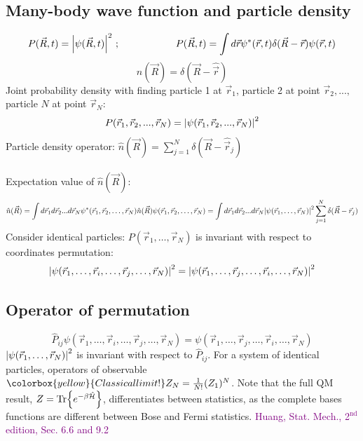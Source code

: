 \documentclass[10pt]{article}
\newcommand{\Ham}{\hat{\mathcal{H}}}
\newcommand{\vecop}[1]{\hat{\vec{#1}}}
\newcommand{\smallspace}{\hspace{2cm}}
\begin{document}
\subsection{Many-body wave function and particle density}
$$
P(\vec R, t) = \qty|\psi(\vec R, t)|^2 \ ; \smallspace P(\vec R, t) = \int d\vec r \psi^\ast(\vec r, t) \delta(\vec R - \vec r) \psi(\vec r, t)
$$
$$
\hat n(\vec R) = \delta(\vec R - \vecop r)
$$
Joint probability density with finding particle 1 at $\vec r_1$, particle 2 at point $\vec r_2, ...,$ particle $N$ at point $\vec r_N$:
$$
P(\vec r_1, \vec r_2, ..., \vec r_N) = \qty|\psi(\vec r_1, \vec r_2, ..., \vec r_N)|^2
$$
Particle density operator: $\hat n(\vec R) = \sum_{j=1}^N \delta(\vec R - \vecop r_j)$ \\ \\
\noindent Expectation value of $\hat n(\vec R):$
$$
\hat n(\vec R) = \int d\vec r_1 d\vec r_2 ... d\vec r_N \psi^\ast(\vec r_1, \vec r_2, \hdots, \vec r_N) \hat n(\vec R) \psi(\vec r_1, \vec r_2, \hdots, \vec r_N)  =  \int d\vec r_1 d\vec r_2 ... d\vec r_N\qty|\psi(\vec r_1, \hdots, \vec r_N)|^2\sum_{j=1}^N\delta(\vec R - \vec r_j)
$$
Consider identical particles: $P(\vec r_1, \hdots, \vec r_N)$ is invariant with respect to coordinates permutation:
$$
\qty|\psi(\vec r_1, \hdots, \vec r_i, \hdots,\vec r_j, \hdots, \vec r_N)|^2 = \qty|\psi(\vec r_1, \hdots, \vec r_j, \hdots, \vec r_i, \hdots, \vec r_N)|^2
$$
\subsection{Operator of permutation}
$$
\hat P_{ij}\psi(\vec r_1, \hdots, \vec r_i, \hdots, \vec r_j, \hdots, \vec r_N) = \psi(\vec r_1, \hdots, \vec r_j, \hdots, \vec r_i, \hdots, \vec r_N)
$$
$\qty|\psi(\vec r_1, \hdots, \vec r_N)|^2$ is invariant with respect to $\hat P_{ij}$. For a system of identical particles, operators of observable $\colorbox{yellow}{Classical limit!} Z_N = \frac{1}{N!}(Z_1)^N$. Note that the full QM result, $Z = \Tr{e^{-\beta \Ham}}$, differentiates between statistics, as the complete bases functions are different between Bose and Fermi statistics. \textcolor{purple}{Huang, Stat. Mech., 2${}^\text{nd}$ edition, Sec. 6.6 and 9.2}
\end{document}
